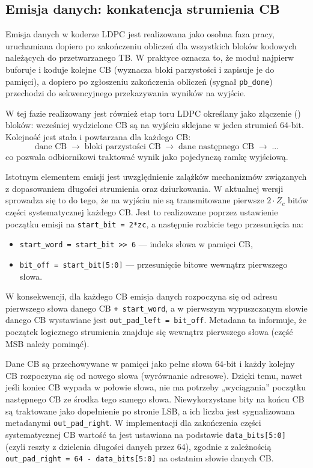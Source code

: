 \subsection{Emisja danych: konkatencja strumienia CB}
\label{subsec:ldpc_encode_emisja}

Emisja danych w koderze LDPC jest realizowana jako osobna faza pracy, uruchamiana dopiero po zakończeniu obliczeń dla wszystkich bloków kodowych należących do przetwarzanego TB. W praktyce oznacza to, że moduł najpierw buforuje i koduje kolejne CB (wyznacza bloki parzystości i zapisuje je do pamięci), a dopiero po zgłoszeniu zakończenia obliczeń (sygnał \texttt{pb\_done}) przechodzi do sekwencyjnego przekazywania wyników na wyjście.

W tej fazie realizowany jest również etap toru LDPC określany jako złączenie () bloków: wcześniej wydzielone CB są na wyjściu sklejane w jeden strumień 64-bit. Kolejność jest stała i powtarzana dla każdego CB:
\[
\text{dane CB} \;\rightarrow\; \text{bloki parzystości CB} \;\rightarrow\; \text{dane następnego CB} \;\rightarrow\; ...
\]
co pozwala odbiornikowi traktować wynik jako pojedynczą ramkę wyjściową.

Istotnym elementem emisji jest uwzględnienie zalążków mechanizmów związanych z dopasowaniem długości strumienia oraz dziurkowania. W aktualnej wersji sprowadza się to do tego, że na wyjściu nie są transmitowane pierwsze $2\cdot Z_c$ bitów części systematycznej każdego CB. Jest to realizowane poprzez ustawienie początku emisji na \texttt{start\_bit = 2*zc}, a następnie rozbicie tego przesunięcia na:
\begin{itemize}
    \item \texttt{start\_word = start\_bit >> 6} --- indeks słowa w pamięci CB,
    \item \texttt{bit\_off = start\_bit[5:0]} --- przesunięcie bitowe wewnątrz pierwszego słowa.
\end{itemize}
W konsekwencji, dla każdego CB emisja danych rozpoczyna się od adresu pierwszego słowa danego CB \texttt{+ start\_word}, a w pierwszym wypuszczanym słowie danego CB wystawiane jest \texttt{out\_pad\_left = bit\_off}. Metadana ta informuje, że początek logicznego strumienia znajduje się wewnątrz pierwszego słowa (część MSB należy pominąć).

Dane CB są przechowywane w pamięci jako pełne słowa 64-bit i każdy kolejny CB rozpoczyna się od nowego słowa (wyrównanie adresowe). Dzięki temu, nawet jeśli koniec CB wypada w połowie słowa, nie ma potrzeby „wyciągania” początku następnego CB ze środka tego samego słowa. Niewykorzystane bity na końcu CB są traktowane jako dopełnienie po stronie LSB, a ich liczba jest sygnalizowana metadanymi \texttt{out\_pad\_right}. W implementacji dla zakończenia części systematycznej CB wartość ta jest ustawiana na podstawie \texttt{data\_bits[5:0]} (czyli reszty z dzielenia długości danych przez 64), zgodnie z zależnością \texttt{out\_pad\_right = 64 - data\_bits[5:0]} na ostatnim słowie danych CB.

